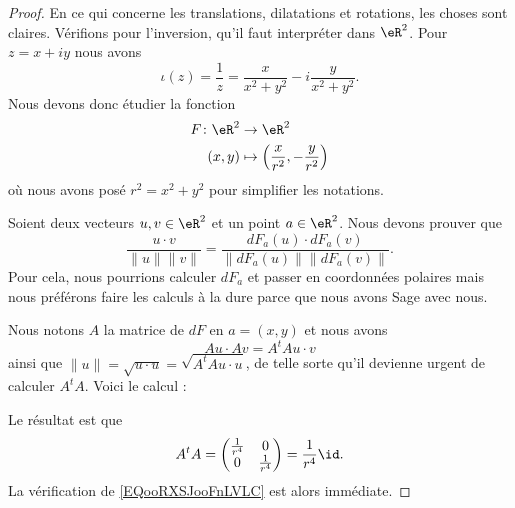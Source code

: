 \begin{proof}
	En ce qui concerne les translations, dilatations et rotations, les choses sont claires. Vérifions pour l'inversion, qu'il faut interpréter dans \( \eR^2\). Pour \( z=x+iy\) nous avons
	\begin{equation}
		\iota(z)=\frac{1}{ z }=\frac{ x }{ x^2+y^2 }-i\frac{ y }{ x^2+y^2 }.
	\end{equation}
	Nous devons donc étudier la fonction
	\begin{equation}
		\begin{aligned}
			F\colon \eR^2 & \to \eR^2                                                   \\
			(x,y)         & \mapsto \left( \frac{ x }{ r^2 },-\frac{ y }{ r^2 } \right)
		\end{aligned}
	\end{equation}
	où nous avons posé \( r^2=x^2+y^2\) pour simplifier les notations.

	Soient deux vecteurs \( u,v\in \eR^2\) et un point \( a\in \eR^2\). Nous devons prouver que
	\begin{equation}        \label{EQooRXSJooFnLVLC}
		\frac{ u\cdot v }{ \| u \|\| v \| }=\frac{ dF_a(u)\cdot dF_a(v)  }{ \| dF_a(u) \|\| dF_a(v) \| }.
	\end{equation}
	Pour cela, nous pourrions calculer \( dF_a\) et passer en coordonnées polaires\cite{ooDTHEooBAnkGP} mais nous préférons faire les calculs à la dure parce que nous avons Sage avec nous.

	Nous notons \( A\) la matrice de \( dF\) en \( a=(x,y)\) et nous avons
	\begin{equation}
		Au\cdot Av=A^tAu\cdot v
	\end{equation}
	ainsi que \( \| u \|=\sqrt{ u\cdot u }=\sqrt{ A^tAu\cdot u }\), de telle sorte qu'il devienne urgent de calculer \( A^tA\). Voici le calcul :

	

	Le résultat est que
	\begin{equation}
		A^tA=\begin{pmatrix}
			\frac{1}{ r^4 } & 0               \\
			0               & \frac{1}{ r^4 }
		\end{pmatrix}=\frac{1}{ r^4 }\id.
	\end{equation}
	La vérification de \eqref{EQooRXSJooFnLVLC} est alors immédiate.
\end{proof}

